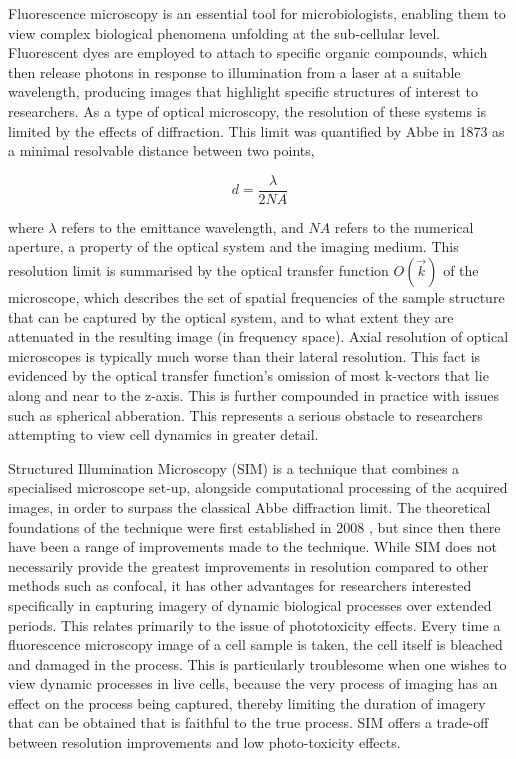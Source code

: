 \documentclass[12pt]{article}
\newcommand\NA{\mathit{NA}}
\begin{document}
Fluorescence microscopy is an essential tool for microbiologists,
enabling them to view complex biological phenomena unfolding at the sub-cellular level.
Fluorescent dyes are employed to attach to specific organic compounds,
which then release photons in response to illumination from a laser at a suitable wavelength,
producing images that highlight specific structures of interest to researchers.
As a type of optical microscopy, the resolution of these systems is limited by the effects of diffraction.
This limit was quantified by Abbe \cite{abbe} in 1873 as a minimal resolvable distance between two points,

\[d=\frac{\lambda}{2\NA}\]

where $\lambda$ refers to the emittance wavelength, and $\NA$ refers to the numerical aperture,
a property of the optical system and the imaging medium.
This resolution limit is summarised by the optical transfer function $O(\vec{k})$ of the microscope,
which describes the set of spatial frequencies of the sample structure that can be captured by the optical system,
and to what extent they are attenuated in the resulting image (in frequency space).
Axial resolution of optical microscopes is typically much worse than their lateral resolution.
This fact is evidenced by the optical transfer function's omission of most k-vectors that lie along and near to the z-axis.
This is further compounded in practice with issues such as spherical abberation.
This represents a serious obstacle to researchers attempting to view cell dynamics in greater detail.

Structured Illumination Microscopy (SIM) is a technique that combines a specialised microscope set-up,
alongside computational processing of the acquired images,
in order to surpass the classical Abbe diffraction limit.
The theoretical foundations of the technique were first established in 2008 \cite{originalSIM},
but since then there have been a range of improvements made to the technique.
While SIM does not necessarily provide the greatest improvements in resolution compared to other methods such as confocal,
it has other advantages for researchers interested specifically in capturing imagery of dynamic biological processes over extended periods.
This relates primarily to the issue of phototoxicity effects.
Every time a fluorescence microscopy image of a cell sample is taken, the cell itself is bleached and damaged in the process.
This is particularly troublesome when one wishes to view dynamic processes in live cells,
because the very process of imaging has an effect on the process being captured,
thereby limiting the duration of imagery that can be obtained that is faithful to the true process.
SIM offers a trade-off between resolution improvements and low photo-toxicity effects.
\end{document}
